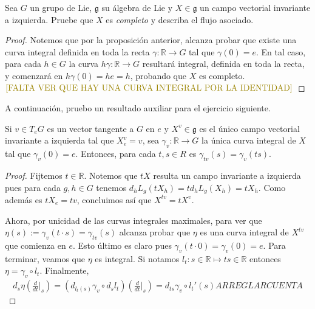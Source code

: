 \documentclass[11pt]{article}
\newcommand{\R}{\mathbb{R}}
\newcommand{\paint}[1]{\color{color}{#1}}
\newenvironment{lemma}[2][Lema]{\begin{trivlist}
\item[\hskip \labelsep \paint{{\bfseries #1}}\hskip \labelsep {\bfseries #2.}]}{\end{trivlist}}
\newenvironment{exercise}[2][Ejercicio]{\begin{trivlist}
\item[\hskip \labelsep \paint{{\bfseries #1}}\hskip \labelsep {\bfseries #2.}]}{\end{trivlist}}
\begin{document}
\begin{exercise}{8} Sea $G$ un grupo de Lie, $\mathfrak{g}$ su \'algebra de Lie y $X\in\mathfrak{g}$ un campo vectorial invariante a izquierda. Pruebe que $X$ es \emph{completo} y describa el flujo asociado.
\end{exercise}
\begin{proof} Notemos que por la proposici\'on anterior, alcanza probar que existe una curva integral definida en toda la recta $\gamma : \R \to G$ tal que $\gamma(0) = e$. En tal caso, para cada $h \in G$ la curva $h \gamma : \R \to G$ resultar\'a integral, definida en toda la recta, y comenzar\'a en $h\gamma(0) = he = h$, probando que $X$ es completo.  $\paint{\text{[FALTA VER QUE HAY UNA CURVA INTEGRAL POR LA IDENTIDAD]}}$
\end{proof}

A continuaci\'on, pruebo un resultado auxiliar para el ejercicio siguiente.

\begin{lemma}{3} Si $v\in T_eG$ es un vector tangente a $G$ en $e$ y $X^v \in\mathfrak{g}$ es el \'unico campo vectorial invariante a izquierda tal que $X^v_e=v$, sea $\gamma_v:\R\to G$ la \'unica curva integral de $X$ tal que $\gamma_v(0)=e.$ Entonces, para cada $t,s \in R$ es $\gamma_{tv}(s) = \gamma_{v}(ts)$.
\end{lemma}
\begin{proof} Fijtemos $t \in \R$. Notemos que $tX$ resulta un campo invariante a izquierda pues para cada $g,h \in G$ tenemos $d_hL_g(tX_h) = td_hL_g(X_h) = tX_h$. Como adem\'as es $tX_e = tv$, concluimos as\'i que $X^{tv} = tX^v$.

Ahora, por unicidad de las curvas integrales maximales, para ver que $\eta(s) := \gamma_v(t \cdot s) = \gamma_{tv}(s)$ alcanza probar que $\eta$ es una curva integral de $X^{tv}$ que comienza en $e$. Esto \'ultimo es claro pues $\gamma_v(t \cdot 0) = \gamma_v(0) = e$. Para terminar, veamos que $\eta$ es integral. Si notamos $l_t : s \in \R \mapsto ts \in \R$ entonces $\eta = \gamma_{v} \circ l_t$. Finalmente, 
\begin{align*}
d_s\eta\left(\frac{d}{dt}\Big|_s\right) = (d_{l_t(s)}\gamma_{v} \circ d_sl_t) \left(\frac{d}{dt}\Big|_s\right) = d_{ts}\gamma_{v} \circ l_t'(s) ARREGLAR CUENTA
\end{align*}
\end{proof}
\end{document}
